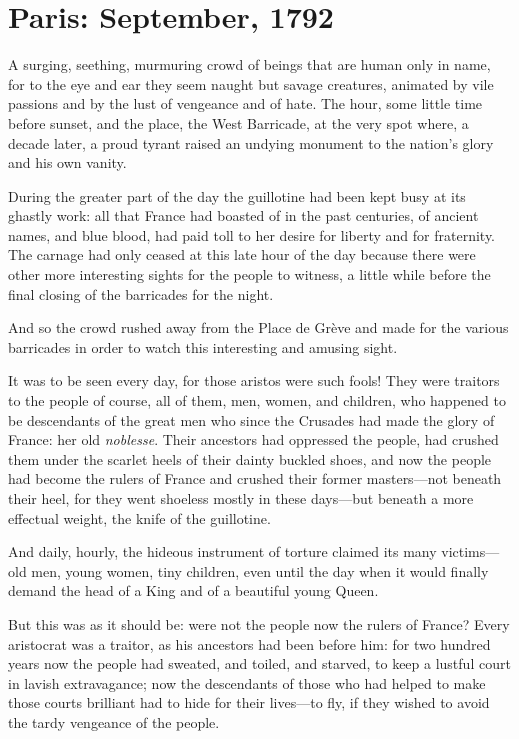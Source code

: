 \chapter{Paris: September, 1792}
\lettrine[lines=4]{A}{} surging, seething, murmuring crowd of beings that are human only in name, for to the eye and ear they seem naught but savage creatures, animated by vile passions and by the lust of vengeance and of hate. The hour, some little time before sunset, and the place, the West Barricade, at the very spot where, a decade later, a proud tyrant raised an undying monument to the nation's glory and his own vanity.

During the greater part of the day the guillotine had been kept busy at its ghastly work: all that France had boasted of in the past centuries, of ancient names, and blue blood, had paid toll to her desire for liberty and for fraternity. The carnage had only ceased at this late hour of the day because there were other more interesting sights for the people to witness, a little while before the final closing of the barricades for the night.

And so the crowd rushed away from the Place de Grève and made for the various barricades in order to watch this interesting and amusing sight.

It was to be seen every day, for those aristos were such fools! They were traitors to the people of course, all of them, men, wo\-men, and children, who happened to be descendants of the great men who since the Crusades had made the glory of France: her old \textit{noblesse}. Their ancestors had oppressed the people, had crushed them under the scarlet heels of their dainty buckled shoes, and now the people had become the rulers of France and crushed their former masters\allowbreak---\allowbreak not beneath their heel, for they went shoeless mostly in these days\allowbreak---\allowbreak but beneath a more effectual weight, the knife of the guillotine.

And daily, hourly, the hideous instrument of torture claimed its many victims\allowbreak---\allowbreak old men, young women, tiny children, even until the day when it would finally demand the head of a King and of a beautiful young Queen.

But this was as it should be: were not the people now the rulers of France? Every aristocrat was a traitor, as his ancestors had been before him: for two hundred years now the people had sweated, and toiled, and starved, to keep a lustful court in lavish extravagance; now the descendants of those who had helped to make those courts brilliant had to hide for their lives\allowbreak---\allowbreak to fly, if they wished to avoid the tardy vengeance of the people.

